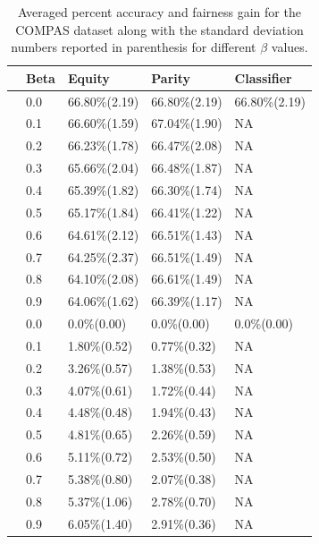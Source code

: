 \begin{table}[h]
\begin{tabular}{c p{0.5cm} p{1.8cm} p{1.8cm} p{1.7cm}}
 \toprule
& \textbf{Beta} & \textbf{Equity} &\textbf{Parity}&\textbf{Classifier}\\
 \midrule
 \parbox[t]{2mm}{} & 
 0.0&66.80\%(2.19)& 66.80\%(2.19)&66.80\%(2.19)\\[2pt]
   &0.1&66.60\%(1.59)& 67.04\%(1.90)&NA\\[1pt]
   &0.2&66.23\%(1.78)&66.47\%(2.08) &NA\\[1pt]
   &0.3&65.66\%(2.04)& 66.48\%(1.87)&NA\\[1pt]
   &0.4&65.39\%(1.82)&66.30\%(1.74) &NA\\[1pt]
 & 0.5&65.17\%(1.84)&66.41\%(1.22)&NA\\[1pt]
 &0.6&64.61\%(2.12)&66.51\%(1.43)&NA\\[1pt]
 &0.7&64.25\%(2.37)&66.51\%(1.49) &NA\\[1pt]
 &0.8&64.10\%(2.08)&66.61\%(1.49) &NA\\[1pt]
  &0.9&64.06\%(1.62)&66.39\%(1.17)&NA\\[1pt]
 \bottomrule
 \parbox[t]{2mm}{} & 
   0.0&0.0\%(0.00)& 0.0\%(0.00)&0.0\%(0.00)\\[1pt]
   &0.1&1.80\%(0.52)& 0.77\%(0.32)&NA\\[1pt]
   &0.2&3.26\%(0.57)& 1.38\%(0.53)&NA\\[1pt]
   &0.3&4.07\%(0.61)& 1.72\%(0.44)&NA\\[1pt]
   &0.4&4.48\%(0.48)& 1.94\%(0.43)&NA\\[1pt]
 & 0.5&4.81\%(0.65)& 2.26\%(0.59)&NA\\[1pt]
 &0.6&5.11\%(0.72)& 2.53\%(0.50)&NA\\[1pt]
 &0.7&5.38\%(0.80)& 2.07\%(0.38)&NA\\[1pt]
 &0.8&5.37\%(1.06)& 2.78\%(0.70)&NA\\[1pt]
  &0.9&6.05\%(1.40)& 2.91\%(0.36)&NA\\[1pt]
  \bottomrule
\end{tabular}
\caption{Averaged percent accuracy and fairness gain for the COMPAS dataset along with the standard deviation numbers reported in parenthesis for different $\beta$ values.}
\label{compas_acc_gain}
\end{table}

